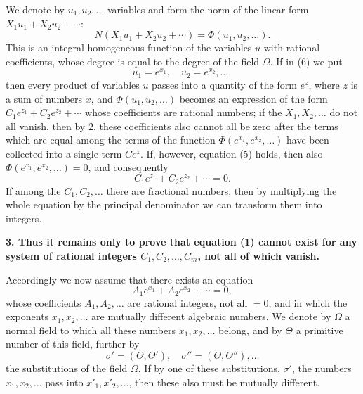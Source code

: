 \documentclass[11pt]{article}
\begin{document}
We denote by $u_1,u_2,\ldots$ variables and form the norm of the linear form $X_1u_1+X_2u_2+\cdots$:
\begin{equation}\tag{6}
N(X_1u_1+X_2u_2+\cdots)=\Phi(u_1,u_2,\ldots).
\end{equation}
This is an integral homogeneous function of the variables $u$ with rational coefficients, whose degree is equal to the degree of the field $\Omega$. If in (6) we put
\[
u_1=e^{x_1},\quad u_2=e^{x_2},\ldots,
\]
then every product of variables $u$ passes into a quantity of the form $e^z$, where $z$ is a sum of numbers $x$, and $\Phi(u_1,u_2,\ldots)$ becomes an expression of the form $C_1e^{z_1}+C_2e^{z_2}+\cdots$ whose coefficients are rational numbers; if the $X_1,X_2,\ldots$ do not all vanish, then by 2. these coefficients also cannot all be zero after the terms which are equal among the terms of the function $\Phi(e^{x_1},e^{x_2},\ldots)$ have been collected into a single term $Ce^z$. If, however, equation (5) holds, then also $\Phi(e^{x_1},e^{x_2},\ldots)=0$, and consequently
\[
C_1e^{z_1}+C_2e^{z_2}+\cdots=0.
\]
If among the $C_1,C_2,\ldots$ there are fractional numbers, then by multiplying the whole equation by the principal denominator we can transform them into integers.

\textbf{3. Thus it remains only to prove that equation (1) cannot exist for any system of rational integers $C_1,C_2,\ldots,C_m$, not all of which vanish.}

Accordingly we now assume that there exists an equation
\begin{equation}\tag{7}
A_1e^{x_1}+A_2e^{x_2}+\cdots=0,
\end{equation}
whose coefficients $A_1,A_2,\ldots$ are rational integers,
not all $=0$, and in which the exponents $x_1,x_2,\ldots$ are mutually different algebraic numbers. We denote by $\Omega$ a normal field to which all these numbers $x_1,x_2,\ldots$ belong, and by $\Theta$ a primitive number of this field, further by
\[
\sigma'=(\Theta,\Theta'),\quad \sigma''=(\Theta,\Theta''),\ldots
\]
the substitutions of the field $\Omega$. If by one of these substitutions, $\sigma'$, the numbers $x_1,x_2,\ldots$ pass into $x'_1,x'_2,\ldots$, then these also must be mutually different.
\end{document}
